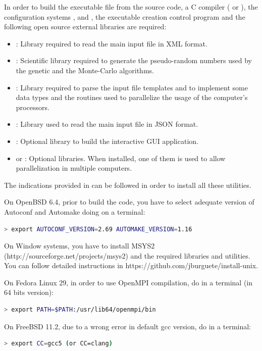 \documentclass[a4paper]{report}
\begin{document}
In order to build the executable file from the source code, a C compiler (\citet{gcc} or \citet{clang}), the configuration systems \citet{autoconf}, \citet{automake} and \citet{pkgconfig}, the executable creation control program \citet{gnumake} and the following open source external libraries are required:
\begin{itemize}
\item\citet{libxml}: Library required to read the main input file in XML format.
\item\citet{gsl}: Scientific library required to generate the pseudo-random numbers used by the genetic and the Monte-Carlo algorithms.
\item\citet{glib}: Library required to parse the input file templates and to implement some data types and the routines used to parallelize the usage of the computer's processors.
\item\citet{json-glib}: Library used to read the main input file in JSON format.
\item\citet{gtk}: Optional library to build the interactive GUI application.
\item\citet{openmpi} or \citet{mpich}: Optional libraries. When installed, one
of them is used to allow parallelization in multiple computers.
\end{itemize}
The indications provided in \citet{install-unix} can be followed in order to install all these utilities.

On OpenBSD 6.4, prior to build the code, you have to select adequate version of Autoconf and Automake doing on a terminal:
\begin{lstlisting}[language=bash,basicstyle=\scriptsize]
> export AUTOCONF_VERSION=2.69 AUTOMAKE_VERSION=1.16
\end{lstlisting}

On Window systems, you have to install MSYS2
(http://sourceforge.net/projects/msys2) and the required libraries and
utilities. You can follow detailed instructions in
https://github.com/jburguete/install-unix.

On Fedora Linux 29, in order to use OpenMPI compilation, do in a terminal (in 64
bits version):
\begin{lstlisting}[language=bash,basicstyle=\scriptsize]
> export PATH=$PATH:/usr/lib64/openmpi/bin
\end{lstlisting}

On FreeBSD 11.2, due to a wrong error in default gcc version, do in a terminal:
\begin{lstlisting}[language=bash,basicstyle=\scriptsize]
> export CC=gcc5 (or CC=clang)
\end{lstlisting}
\end{document}
